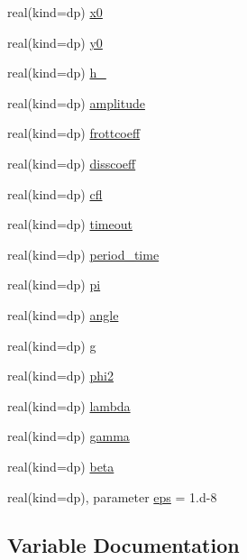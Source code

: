 \begin{DoxyCompactItemize}
\item 
real(kind=dp) \mbox{\hyperlink{namespaceglobalparam_a9e5d836cf78ed835befb0354a98e7e17}{x0}}
\item 
real(kind=dp) \mbox{\hyperlink{namespaceglobalparam_a6192d97c147b8b0f5ebda79933dd6f16}{y0}}
\item 
real(kind=dp) \mbox{\hyperlink{namespaceglobalparam_afa512f0663f1649ec948dd8629ded9c2}{h\+\_}}
\item 
real(kind=dp) \mbox{\hyperlink{namespaceglobalparam_ad4de2aae56528f5e68832e367c812b7e}{amplitude}}
\item 
real(kind=dp) \mbox{\hyperlink{namespaceglobalparam_a3d60c54a7f29c018175090d8f352e532}{frottcoeff}}
\item 
real(kind=dp) \mbox{\hyperlink{namespaceglobalparam_a2b80e7d2d9fedcf41afb3a695951758b}{disscoeff}}
\item 
real(kind=dp) \mbox{\hyperlink{namespaceglobalparam_adfd0d04d365d8eea624298b512502b3a}{cfl}}
\item 
real(kind=dp) \mbox{\hyperlink{namespaceglobalparam_a10139a2787968ad3cf07f503ad8dd164}{timeout}}
\item 
real(kind=dp) \mbox{\hyperlink{namespaceglobalparam_aedbaf94b837b9fa76dfe9fb6d99b21b4}{period\+\_\+time}}
\item 
real(kind=dp) \mbox{\hyperlink{namespaceglobalparam_af8b4334cb676810d60c0e1a746531412}{pi}}
\item 
real(kind=dp) \mbox{\hyperlink{namespaceglobalparam_afc46f9587744d04e67298c60303cd5f0}{angle}}
\item 
real(kind=dp) \mbox{\hyperlink{namespaceglobalparam_a5ea70464e51d2dc580f4c6c8b451cb01}{g}}
\item 
real(kind=dp) \mbox{\hyperlink{namespaceglobalparam_a7e2e3cc9c0b15b0250b31dd03fb704c6}{phi2}}
\item 
real(kind=dp) \mbox{\hyperlink{namespaceglobalparam_afcf85dea7c5d650ef77d480eb6d2a614}{lambda}}
\item 
real(kind=dp) \mbox{\hyperlink{namespaceglobalparam_a22c2013f9cb1fb03d79e99fc038d55d1}{gamma}}
\item 
real(kind=dp) \mbox{\hyperlink{namespaceglobalparam_a71ed33aead9f8bd6716557281b189e3c}{beta}}
\item 
real(kind=dp), parameter \mbox{\hyperlink{namespaceglobalparam_a50294033ac3a178743643d3203a2d364}{eps}} = 1.d-\/8
\end{DoxyCompactItemize}


\subsection{Variable Documentation}
\mbox{\label{namespaceglobalparam_ad4de2aae56528f5e68832e367c812b7e}} 
